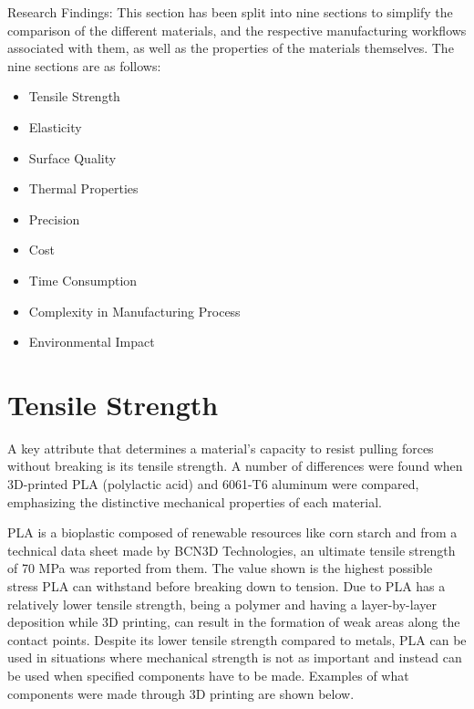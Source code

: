 
Research Findings:
This section has been split into nine sections to simplify the comparison of the different materials, and the respective manufacturing workflows associated with them, as well as the properties of the materials themselves. The nine sections are as follows:

\begin{itemize}[itemsep=2mm]
    \item Tensile Strength
    \item Elasticity
    \item Surface Quality
    \item Thermal Properties
    \item Precision
    \item Cost
    \item Time Consumption
    \item Complexity in Manufacturing Process
    \item Environmental Impact
\end{itemize}


\section{Tensile Strength}

    A key attribute that determines a material's capacity to resist pulling forces without breaking is its
    tensile strength. A number of differences were found when 3D-printed PLA (polylactic acid) and 6061-T6 aluminum were compared, emphasizing the distinctive mechanical properties of each material.

    PLA is a bioplastic composed of renewable resources like corn starch and from a technical data sheet
    made by BCN3D Technologies, an ultimate tensile strength of 70 MPa was reported from them. %
    The value shown is the highest possible stress PLA can withstand before breaking down to tension. Due to
    PLA has a relatively lower tensile strength, being a polymer and having a layer-by-layer deposition while 3D printing, can result in the formation of weak areas along the contact points. Despite its lower
    tensile strength compared to metals, PLA can be used in situations where mechanical strength is not as important and instead can be used when specified components have to be made. Examples of what
    components were made through 3D printing are shown below.
    

